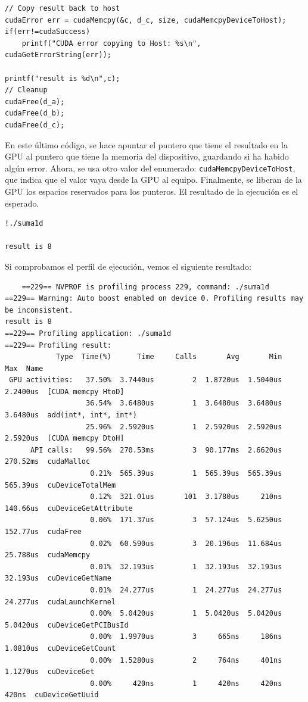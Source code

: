 \documentclass[11pt]{article}
\def\inline{\lstinline[basicstyle=\ttfamily,keywordstyle={}]}
\begin{document}
\begin{verbatim}
// Copy result back to host
cudaError err = cudaMemcpy(&c, d_c, size, cudaMemcpyDeviceToHost);
if(err!=cudaSuccess) 
	printf("CUDA error copying to Host: %s\n", cudaGetErrorString(err));

printf("result is %d\n",c);
// Cleanup
cudaFree(d_a);
cudaFree(d_b);
cudaFree(d_c);
\end{verbatim}

En este último código, se hace apuntar el puntero que tiene el resultado en la GPU al puntero que tiene la memoria del dispositivo, guardando si ha habido algún error. Ahora, se usa otro valor del enumerado: \inline{cudaMemcpyDeviceToHost}, que indica que el valor vaya desde la GPU al equipo. Finalmente, se liberan de la GPU los espacios reservados para los punteros. El resultado de la ejecución es el esperado.

\begin{verbatim}
!./suma1d

result is 8
\end{verbatim}

Si comprobamos el perfil de ejecución, vemos el siguiente resultado:

\begin{verbatim}
	==229== NVPROF is profiling process 229, command: ./suma1d
==229== Warning: Auto boost enabled on device 0. Profiling results may be inconsistent.
result is 8
==229== Profiling application: ./suma1d
==229== Profiling result:
            Type  Time(%)      Time     Calls       Avg       Min       Max  Name
 GPU activities:   37.50%  3.7440us         2  1.8720us  1.5040us  2.2400us  [CUDA memcpy HtoD]
                   36.54%  3.6480us         1  3.6480us  3.6480us  3.6480us  add(int*, int*, int*)
                   25.96%  2.5920us         1  2.5920us  2.5920us  2.5920us  [CUDA memcpy DtoH]
      API calls:   99.56%  270.53ms         3  90.177ms  2.6620us  270.52ms  cudaMalloc
                    0.21%  565.39us         1  565.39us  565.39us  565.39us  cuDeviceTotalMem
                    0.12%  321.01us       101  3.1780us     210ns  140.66us  cuDeviceGetAttribute
                    0.06%  171.37us         3  57.124us  5.6250us  152.77us  cudaFree
                    0.02%  60.590us         3  20.196us  11.684us  25.788us  cudaMemcpy
                    0.01%  32.193us         1  32.193us  32.193us  32.193us  cuDeviceGetName
                    0.01%  24.277us         1  24.277us  24.277us  24.277us  cudaLaunchKernel
                    0.00%  5.0420us         1  5.0420us  5.0420us  5.0420us  cuDeviceGetPCIBusId
                    0.00%  1.9970us         3     665ns     186ns  1.0810us  cuDeviceGetCount
                    0.00%  1.5280us         2     764ns     401ns  1.1270us  cuDeviceGet
                    0.00%     420ns         1     420ns     420ns     420ns  cuDeviceGetUuid
\end{verbatim}
\end{document}
